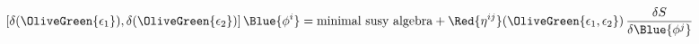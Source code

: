 \begin{equation}
  \left[ \delta (\OliveGreen{\epsilon _1}),\delta (\OliveGreen{\epsilon _2})\right] \Blue{\phi^i}
=\mbox{minimal susy algebra}+\Red{\eta ^{ij}}(\OliveGreen{\epsilon
_1,\epsilon _2})\,\frac{\delta S}{\delta \Blue{\phi ^j}}
 \label{algWithTriv}
\end{equation}

